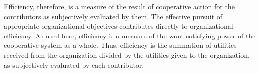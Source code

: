 Efficiency, therefore, is a measure of the result of cooperative action for the contributors as subjectively evaluated by them. The effective pursuit of appropriate organizational objectives contributes directly to organizational efficiency. As used here, efficiency is a measure of the want-satisfying power of the cooperative system as a whole. Thus, efficiency is the summation of utilities received from the organization divided by the utilities given to the organization, as subjectively evaluated by each contributor.
